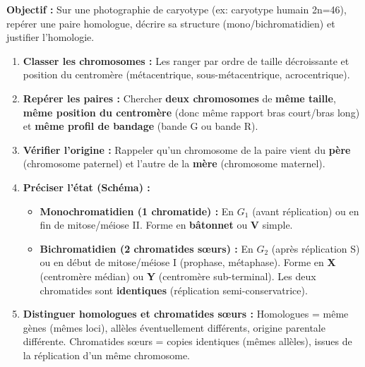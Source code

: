 \documentclass[11pt]{article}
\begin{document}
\begin{methode}
\textbf{Objectif :} Sur une photographie de caryotype (ex: caryotype humain 2n=46), repérer une paire homologue, décrire sa structure (mono/bichromatidien) et justifier l'homologie.
\begin{enumerate}
    \item \textbf{Classer les chromosomes :} Les ranger par ordre de taille décroissante et position du centromère (métacentrique, sous-métacentrique, acrocentrique).
    \item \textbf{Repérer les paires :} Chercher \textbf{deux chromosomes} de \textbf{même taille}, \textbf{même position du centromère} (donc même rapport bras court/bras long) et \textbf{même profil de bandage} (bande G ou bande R).
    \item \textbf{Vérifier l'origine :} Rappeler qu'un chromosome de la paire vient du \textbf{père} (chromosome paternel) et l'autre de la \textbf{mère} (chromosome maternel).
    \item \textbf{Préciser l'état (Schéma) :}
        \begin{itemize}
            \item \textbf{Monochromatidien (1 chromatide) :} En $G_1$ (avant réplication) ou en fin de mitose/méiose II. Forme en \textbf{bâtonnet} ou \textbf{V} simple.
            \item \textbf{Bichromatidien (2 chromatides sœurs) :} En $G_2$ (après réplication S) ou en début de mitose/méiose I (prophase, métaphase). Forme en \textbf{X} (centromère médian) ou \textbf{Y} (centromère sub-terminal). Les deux chromatides sont \textbf{identiques} (réplication semi-conservatrice).
        \end{itemize}
    \item \textbf{Distinguer homologues et chromatides sœurs :} Homologues = même gènes (mêmes loci), allèles éventuellement différents, origine parentale différente. Chromatides sœurs = copies identiques (mêmes allèles), issues de la réplication d'un même chromosome.
\end{enumerate}
\end{methode}
\end{document}
